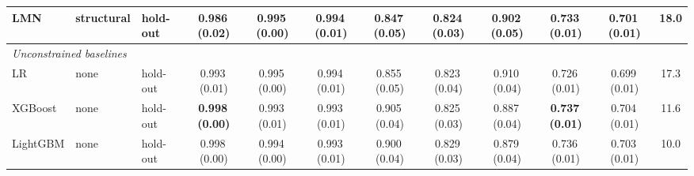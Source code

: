 \begin{table}[!tbp]
{\begin{tabular}{lllccccccccc}
LMN & structural & hold-out & 0.986\,{\scriptsize(0.02)} & 0.995\,{\scriptsize(0.00)} & 0.994\,{\scriptsize(0.01)} & 0.847\,{\scriptsize(0.05)} & 0.824\,{\scriptsize(0.03)} & 0.902\,{\scriptsize(0.05)} & 0.733\,{\scriptsize(0.01)} & 0.701\,{\scriptsize(0.01)} & 18.0 \\
\midrule
\multicolumn{12}{l}{\textit{Unconstrained baselines}} \\
LR & none & hold-out & 0.993\,{\scriptsize(0.01)} & 0.995\,{\scriptsize(0.00)} & 0.994\,{\scriptsize(0.01)} & 0.855\,{\scriptsize(0.05)} & 0.823\,{\scriptsize(0.04)} & 0.910\,{\scriptsize(0.04)} & 0.726\,{\scriptsize(0.01)} & 0.699\,{\scriptsize(0.01)} & 17.3 \\
XGBoost & none & hold-out & \textbf{0.998\,{\scriptsize(0.00)}} & 0.993\,{\scriptsize(0.01)} & 0.993\,{\scriptsize(0.01)} & 0.905\,{\scriptsize(0.04)} & 0.825\,{\scriptsize(0.03)} & 0.887\,{\scriptsize(0.04)} & \textbf{0.737\,{\scriptsize(0.01)}} & 0.704\,{\scriptsize(0.01)} & 11.6 \\
LightGBM & none & hold-out & 0.998\,{\scriptsize(0.00)} & 0.994\,{\scriptsize(0.00)} & 0.993\,{\scriptsize(0.01)} & 0.900\,{\scriptsize(0.04)} & 0.829\,{\scriptsize(0.03)} & 0.879\,{\scriptsize(0.04)} & 0.736\,{\scriptsize(0.01)} & 0.703\,{\scriptsize(0.01)} & 10.0 \\
\bottomrule\end{tabular}}
\end{table}
